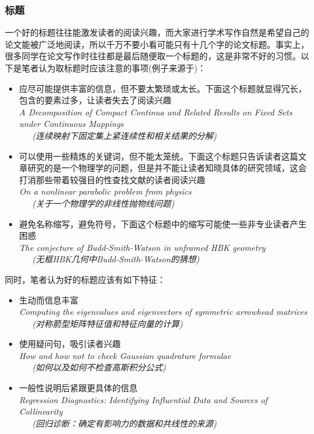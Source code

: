 \documentclass{formatBook}
\begin{document}
\subsubsection{标题}
一个好的标题往往能激发读者的阅读兴趣，而大家进行学术写作自然是希望自己的论文能被广泛地阅读，所以千万不要小看可能只有十几个字的论文标题。事实上，很多同学在论文写作时往往都是最后随便取一个标题的，这是非常不好的习惯。以下是笔者认为取标题时应该注意的事项(例子来源于\cite{jungel_how_nodate})：
\begin{itemize}
    \item 应尽可能提供丰富的信息，但不要太繁琐或太长。下面这个标题就显得冗长，包含的要素过多，让读者失去了阅读兴趣\\
          \textit{A Decomposition of Compact Continua and Related Results on Fixed Sets under Continuous Mappings \\ \ \ \  (连续映射下固定集上紧连续性和相关结果的分解)}
    \item 可以使用一些精炼的关键词，但不能太笼统。下面这个标题只告诉读者这篇文章研究的是一个物理学的问题，但是并不能让读者知晓具体的研究领域，这会打消那些带着较强目的性查找文献的读者阅读兴趣\\
          \textit{On a nonlinear parabolic problem from physics \\ \ \ \  (关于一个物理学的非线性抛物线问题)}
    \item 避免名称缩写，避免符号，下面这个标题中的缩写可能使一些非专业读者产生困惑\\
          \textit{The conjecture of Budd-Smith-Watson in unframed HBK geometry  \\ \ \ \ (无框HBK几何中Budd-Smith-Watson的猜想)}
\end{itemize}
\par
同时，笔者认为好的标题应该有如下特征：
\begin{itemize}
    \item 生动而信息丰富\\
          \textit{Computing the eigenvalues and eigenvectors of symmetric arrowhead matrices \\ \ \ \ (对称箭型矩阵特征值和特征向量的计算)}
    \item 使用疑问句，吸引读者兴趣\\
          \textit{How and how not to check Gaussian quadrature formulae \\ \ \ \ (如何以及如何不检查高斯积分公式)}
    \item 一般性说明后紧跟更具体的信息\\
          \textit{Regression Diagnostics: Identifying Influential Data and Sources of Collinearity \\  \ \ \
              (回归诊断：确定有影响力的数据和共线性的来源)}
\end{itemize}
\end{document}
